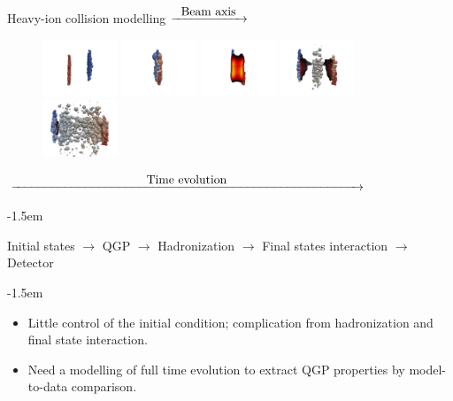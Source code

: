 \documentclass[11pt]{beamer}
\begin{document}
\begin{frame}{Heavy-ion collision modelling}
$\xrightarrow{\makebox[2cm]{Beam axis}}$
    \begin{figure}
   	\begin{center}
	\includegraphics[width=0.2\textwidth]{pics/new1.png} 
	\includegraphics[width=0.2\textwidth]{pics/new50.png} 
	\includegraphics[width=0.2\textwidth]{pics/new100.png}	
	\includegraphics[width=0.2\textwidth]{pics/new230.png}  
	\includegraphics[width=0.2\textwidth]{pics/new300.png}  
	\end{center} 	
  	\end{figure}
  	\begin{center}
  	$\xrightarrow{\makebox[10cm]{Time evolution}}$
  	\end{center}
\kern-1.5em
\begin{center}
\color{blue} Initial states $\rightarrow$  \color{red} QGP \color{blue}  $\rightarrow$ Hadronization $\rightarrow$ Final states interaction $\rightarrow$ Detector
\end{center}
\kern-1.5em
\begin{itemize}
\item Little control of the initial condition; complication from hadronization and final state interaction.
\item Need a modelling of full time evolution to extract QGP properties by model-to-data comparison.
\end{itemize}
\end{frame}
\end{document}
